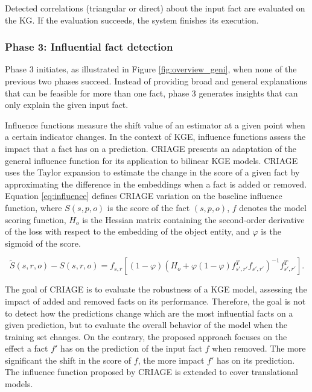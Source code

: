 \hfill

Detected correlations (triangular or direct) about the input fact are evaluated on the KG. If the evaluation succeeds, the system finishes its execution. 

\subsubsection*{Phase 3: Influential fact detection}
Phase 3 initiates, as illustrated in Figure \ref{fig:overview_geni}, when none of the previous two phases succeed. Instead of providing broad and general explanations that can be feasible for more than one fact, phase 3 generates insights that can only explain the given input fact. 

Influence functions measure the shift value of an estimator at a given point when a certain indicator changes. In the context of KGE, influence functions assess the impact that a fact has on a prediction. CRIAGE \citep{criage} presents an adaptation of the general influence function for its application to bilinear KGE models. CRIAGE uses the Taylor expansion to estimate the change in the score of a given fact by approximating the difference in the embeddings when a fact is added or removed. Equation \ref{eq:influence} defines CRIAGE variation on the baseline influence function, where $S(s,p,o)$ is the score of the fact $(s,p,o)$, $f$ denotes the model scoring function, $H_o$ is the Hessian matrix containing the second-order derivative of the loss with respect to the embedding of the object entity, and $\varphi$ is the sigmoid of the score.

\begin{equation}\label{eq:influence}
   \widetilde{S}(s,r,o)-S(s,r,o) = f_{s,r}[(1-\varphi){(H_o+\varphi(1-\varphi)f_{s',r'}^{T}f_{s',r'})}^{-1}f_{s',r'}^{T}].
\end{equation}

The goal of CRIAGE is to evaluate the robustness of a KGE model, assessing the impact of added and removed facts on its performance. Therefore, the goal is not to detect how the predictions change which are the most influential facts on a given prediction, but to evaluate the overall behavior of the model when the training set changes. On the contrary, the proposed approach focuses on the effect a fact $f'$ has on the prediction of the input fact $f$ when removed. The more significant the shift in the score of $f$, the more impact $f'$ has on its prediction. The influence function proposed by CRIAGE is extended to cover translational models.

